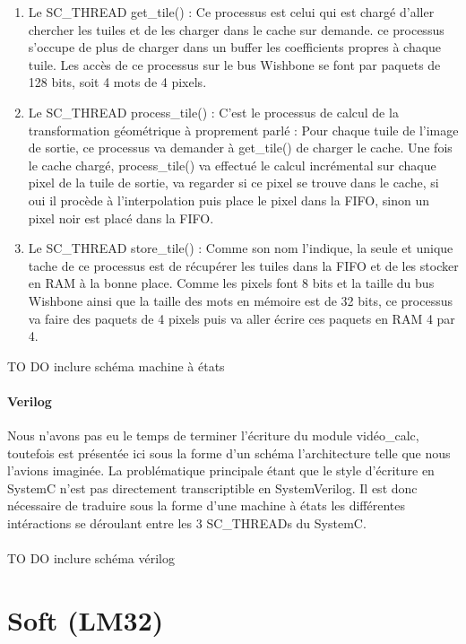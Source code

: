 {{\begin{enumerate}

\item Le SC\_THREAD get\_tile() : Ce processus est celui qui est chargé d'aller chercher les tuiles et de les charger dans le cache sur demande. ce processus s'occupe de plus de charger dans un buffer les coefficients propres à chaque tuile. Les accès de ce processus sur le bus Wishbone se font par paquets de 128 bits, soit 4 mots de 4 pixels.


\item Le SC\_THREAD process\_tile() : C'est le processus de calcul de la transformation géométrique à proprement parlé : Pour chaque tuile de l'image de sortie, ce processus va demander à get\_tile() de charger le cache. Une fois le cache chargé, process\_tile() va effectué le calcul incrémental sur chaque pixel de la tuile de sortie, va regarder si ce pixel se trouve dans le cache, si oui il procède à l'interpolation puis place le pixel dans la FIFO, sinon un pixel noir est placé dans la FIFO.


\item Le SC\_THREAD store\_tile() : Comme son nom l'indique, la seule et unique tache de ce processus est de récupérer les tuiles dans la FIFO et de les stocker en RAM à la bonne place. Comme les  pixels font 8 bits et la taille du bus Wishbone ainsi que la taille des mots en mémoire  est de 32 bits, ce processus va faire des paquets de 4 pixels puis va aller écrire ces paquets en RAM 4 par 4. 
\end{enumerate} 

TO DO inclure schéma machine à états
	
	\subsection{Verilog} 
Nous n'avons pas eu le temps de terminer l'écriture du module vidéo\_calc, toutefois est présentée ici sous la forme d'un schéma l'architecture telle que nous l'avions imaginée. La problématique principale étant que le style d'écriture en SystemC n'est pas directement transcriptible en SystemVerilog. Il est donc nécessaire de traduire sous la forme d'une machine à états les différentes intéractions se déroulant entre les 3 SC\_THREADs du SystemC.
\\
\\
TO DO inclure schéma vérilog

    \part{Soft (LM32)} 

}}
